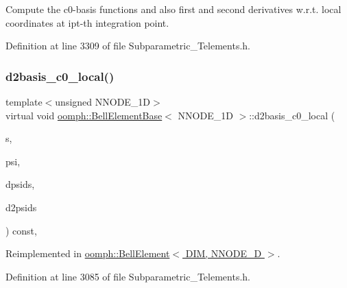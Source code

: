 Compute the c0-\/basis functions and also first and second derivatives w.\+r.\+t. local coordinates at ipt-\/th integration point. 



Definition at line 3309 of file Subparametric\+\_\+\+Telements.\+h.

\mbox{\label{classoomph_1_1BellElementBase_aa9db3995e26ddee02bdae16dae111c03}} 
\subsubsection{\texorpdfstring{d2basis\+\_\+c0\+\_\+local()}{d2basis\_c0\_local()}}
{\footnotesize\ttfamily template$<$unsigned N\+N\+O\+D\+E\+\_\+1D$>$ \\
virtual void \hyperlink{classoomph_1_1BellElementBase}{oomph\+::\+Bell\+Element\+Base}$<$ N\+N\+O\+D\+E\+\_\+1D $>$\+::d2basis\+\_\+c0\+\_\+local (\begin{DoxyParamCaption}\item[{const \hyperlink{classoomph_1_1Vector}{Vector}$<$ double $>$ \&}]{s,  }\item[{\hyperlink{classoomph_1_1Shape}{Shape} \&}]{psi,  }\item[{\hyperlink{classoomph_1_1DShape}{D\+Shape} \&}]{dpsids,  }\item[{\hyperlink{classoomph_1_1DShape}{D\+Shape} \&}]{d2psids }\end{DoxyParamCaption}) const\hspace{0.3cm}{\ttfamily [inline]}, {\ttfamily [virtual]}}



Reimplemented in \hyperlink{classoomph_1_1BellElement_a23f34f6479128e7e8c694fbcb72aae78}{oomph\+::\+Bell\+Element$<$ D\+I\+M, N\+N\+O\+D\+E\+\_\+D $>$}.



Definition at line 3085 of file Subparametric\+\_\+\+Telements.\+h.

\mbox{\label{classoomph_1_1BellElementBase_ac452af5196c5a49040a2d6ab871a1284}} 
